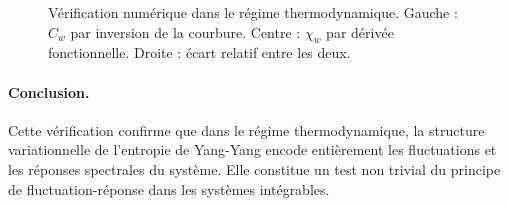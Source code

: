 \begin{figure}[H]
    \centering
    \caption{Vérification numérique dans le régime thermodynamique. Gauche : \(C_w\) par inversion de la courbure. Centre : \(\chi_w\) par dérivée fonctionnelle. Droite : écart relatif entre les deux.}
    \label{fig:chi_thermodynamique}
\end{figure}

\paragraph{Conclusion.} Cette vérification confirme que dans le régime thermodynamique, la structure variationnelle de l’entropie de Yang-Yang encode entièrement les fluctuations et les réponses spectrales du système. Elle constitue un test non trivial du principe de fluctuation-réponse dans les systèmes intégrables.











